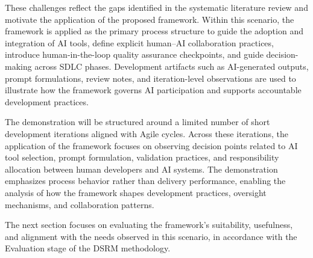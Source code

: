 These challenges reflect the gaps identified in the systematic literature review and motivate the application of the proposed framework. Within this scenario, the framework is applied as the primary process structure to guide the adoption and integration of AI tools, define explicit human–AI collaboration practices, introduce human-in-the-loop quality assurance checkpoints, and guide decision-making across SDLC phases. Development artifacts such as AI-generated outputs, prompt formulations, review notes, and iteration-level observations are used to illustrate how the framework governs AI participation and supports accountable development practices.

The demonstration will be structured around a limited number of short development iterations aligned with Agile cycles. Across these iterations, the application of the framework focuses on observing decision points related to AI tool selection, prompt formulation, validation practices, and responsibility allocation between human developers and AI systems. The demonstration emphasizes process behavior rather than delivery performance, enabling the analysis of how the framework shapes development practices, oversight mechanisms, and collaboration patterns.

The next section focuses on evaluating the framework’s suitability, usefulness, and alignment with the needs observed in this scenario, in accordance with the Evaluation stage of the DSRM methodology.
